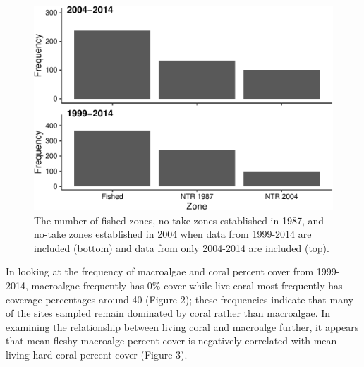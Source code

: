 \documentclass[12pt,]{article}
\begin{document}
\begin{figure}

{\centering \includegraphics{Mullaney_ENV872_Project_files/figure-latex/Zone Exploratory Plot-1} 

}

\caption{The number of fished zones, no-take zones established in 1987, and no-take zones established in 2004 when data from 1999-2014 are included (bottom) and data from only 2004-2014 are included (top).}\label{fig:Zone Exploratory Plot}
\end{figure}

In looking at the frequency of macroalgae and coral percent cover from
1999-2014, macroalgae frequently has 0\% cover while live coral most
frequently has coverage percentages around 40 (Figure 2); these
frequencies indicate that many of the sites sampled remain dominated by
coral rather than macroalgae. In examining the relationship between
living coral and macroalge further, it appears that mean fleshy
macroalge percent cover is negatively correlated with mean living hard
coral percent cover (Figure 3).
\end{document}
